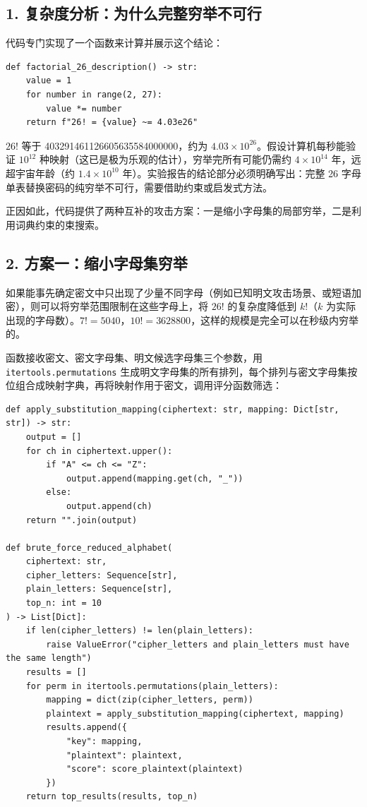 \documentclass[12pt, a4paper]{article}
\begin{document}
\subsection{1. 复杂度分析：为什么完整穷举不可行}

代码专门实现了一个函数来计算并展示这个结论：

\begin{lstlisting}[style=python, caption={26!复杂度计算函数（substitution\_attack.py）}]
def factorial_26_description() -> str:
    value = 1
    for number in range(2, 27):
        value *= number
    return f"26! = {value} ~= 4.03e26"
\end{lstlisting}

$26!$ 等于 403291461126605635584000000，约为 $4.03\times10^{26}$。假设计算机每秒能验证 $10^{12}$ 种映射（这已是极为乐观的估计），穷举完所有可能仍需约 $4\times10^{14}$ 年，远超宇宙年龄（约 $1.4\times10^{10}$ 年）。实验报告的结论部分必须明确写出：完整 26 字母单表替换密码的纯穷举不可行，需要借助约束或启发式方法。

正因如此，代码提供了两种互补的攻击方案：一是缩小字母集的局部穷举，二是利用词典约束的束搜索。

\subsection{2. 方案一：缩小字母集穷举}

如果能事先确定密文中只出现了少量不同字母（例如已知明文攻击场景、或短语加密），则可以将穷举范围限制在这些字母上，将 $26!$ 的复杂度降低到 $k!$（$k$ 为实际出现的字母数）。$7!=5040$，$10!=3628800$，这样的规模是完全可以在秒级内穷举的。

函数接收密文、密文字母集、明文候选字母集三个参数，用 \texttt{itertools.permutations} 生成明文字母集的所有排列，每个排列与密文字母集按位组合成映射字典，再将映射作用于密文，调用评分函数筛选：

\begin{lstlisting}[style=python, caption={缩小字母集穷举函数（substitution\_attack.py）}]
def apply_substitution_mapping(ciphertext: str, mapping: Dict[str, str]) -> str:
    output = []
    for ch in ciphertext.upper():
        if "A" <= ch <= "Z":
            output.append(mapping.get(ch, "_"))
        else:
            output.append(ch)
    return "".join(output)

def brute_force_reduced_alphabet(
    ciphertext: str,
    cipher_letters: Sequence[str],
    plain_letters: Sequence[str],
    top_n: int = 10
) -> List[Dict]:
    if len(cipher_letters) != len(plain_letters):
        raise ValueError("cipher_letters and plain_letters must have the same length")
    results = []
    for perm in itertools.permutations(plain_letters):
        mapping = dict(zip(cipher_letters, perm))
        plaintext = apply_substitution_mapping(ciphertext, mapping)
        results.append({
            "key": mapping,
            "plaintext": plaintext,
            "score": score_plaintext(plaintext)
        })
    return top_results(results, top_n)
\end{lstlisting}
\end{document}
